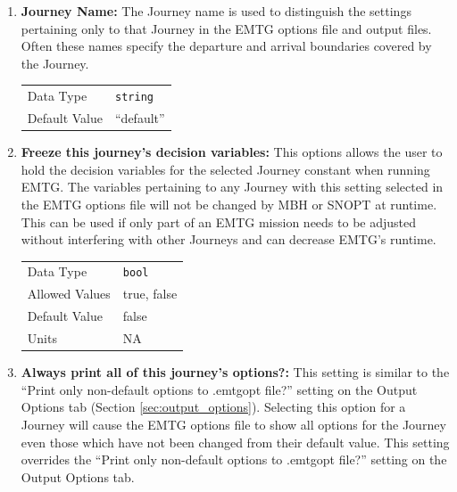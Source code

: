     \begin{enumerate}

    \item \textbf{Journey Name:} The Journey name is used to distinguish the settings pertaining only to that Journey in the \ac{EMTG} options file and output files. Often these names specify the departure and arrival boundaries covered by the Journey.

        \begin{table}[H]
            \hspace{2cm}
            \begin{tabular}{ll}
            Data Type & \verb|string| \\
            Default Value & ``default'' \\
            \end{tabular}
        \end{table}

    
    \item \textbf{Freeze this journey's decision variables:} This options allows the user to hold the decision variables for the selected Journey constant when running \ac{EMTG}. The variables pertaining to any Journey with this setting selected in the \ac{EMTG} options file will not be changed by \ac{MBH} or \ac{SNOPT} at runtime. This can be used if only part of an \ac{EMTG} mission needs to be adjusted without interfering with other Journeys and can decrease \ac{EMTG}'s runtime.
        
        \begin{table}[H]
            \hspace{2cm}
            \begin{tabular}{ll}
            Data Type & \verb|bool| \\
            Allowed Values & true, false \\
            Default Value & false \\
            Units & NA
            \end{tabular}
        \end{table}

    \item \textbf{Always print all of this journey's options?:} This setting is similar to the ``Print only non-default options to .emtgopt file?'' setting on the Output Options tab (Section \ref{sec:output_options}). Selecting this option for a Journey will cause the \ac{EMTG} options file to show all options for the Journey even those which have not been changed from their default value. This setting overrides the ``Print only non-default options to .emtgopt file?'' setting on the Output Options tab.
        

\end{enumerate}
